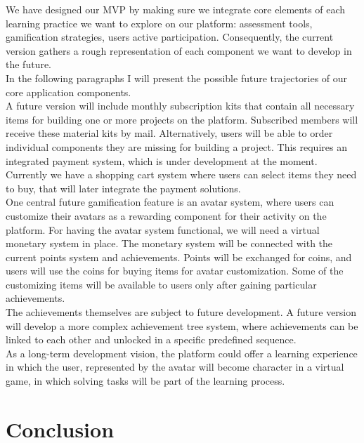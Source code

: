 We have designed our MVP by making sure we integrate core elements of each learning practice we want to explore on our platform: assessment tools, gamification strategies, users active participation.
Consequently, the current version gathers a rough representation of each component we want to develop in the future. \\

In the following paragraphs I will present the possible future trajectories of our core application components. \\

A future version will include monthly subscription kits that contain all necessary items for building one or more projects on the platform. Subscribed members will receive these material kits by mail. Alternatively, users will be able to order individual components they are missing for building a project. This requires an integrated payment system, which is under development at the moment. Currently we have a shopping cart system where users can select items they need to buy, that will later integrate the payment solutions. \\

One central future gamification feature is an avatar system, where users can customize their avatars as a rewarding component for their activity on the platform. For having the avatar system functional, we will need a virtual monetary system in place. The monetary system will be connected with the current points system and achievements. Points will be exchanged for coins, and users will use the coins for buying items for avatar customization. Some of the customizing items will be available to users only after gaining particular achievements. \\

The achievements themselves are subject to future development. A future version will develop a more complex achievement tree system, where achievements can be linked to each other and unlocked in a specific predefined sequence. \\

As a long-term development vision, the platform could offer a learning experience in which the user, represented by the avatar will become character in a virtual game, in which solving tasks will be part of the learning process. \\


\chapter{Conclusion}

